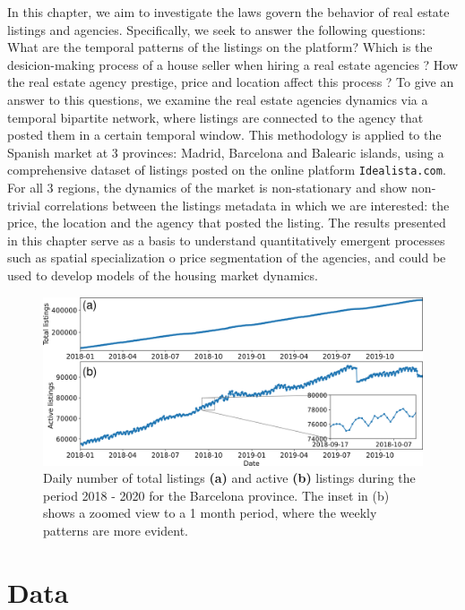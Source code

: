 In this chapter, we aim to investigate the laws govern the behavior of real estate listings and agencies. Specifically, we seek to answer the following questions: What are the temporal patterns of the listings on the platform? Which is the desicion-making process of a house seller when hiring a real estate agencies ? How the real estate agency prestige, price and location affect this process ? To give an answer to this questions, we examine the real estate agencies dynamics via a temporal bipartite network, where listings are connected to the agency that posted them in a certain temporal window. This methodology is applied to the Spanish market at 3 provinces: Madrid, Barcelona and Balearic islands, using a comprehensive dataset of listings posted on the online platform \texttt{Idealista.com}. For all 3 regions, the dynamics of the market is non-stationary and show non-trivial correlations between the listings metadata in which we are interested: the price, the location and the agency that posted the listing. The results presented in this chapter serve as a basis to understand quantitatively emergent processes such as spatial specialization o price segmentation of the agencies, and could be used to develop models of the housing market dynamics.

\begin{figure}
    \vspace{0.2 cm}
    \centering
    \includegraphics[width =\textwidth]{Figs/Idealista_dynamics/adds_evo.pdf}
	\caption[Active listings evolution.]{\label{fig:active_adds} Daily number of total listings \textbf{(a)} and active \textbf{(b)} listings during the period 2018 - 2020 for the Barcelona province. The inset in (b) shows a zoomed view to a 1 month period, where the weekly patterns are more evident.}
\end{figure}


\section{Data \label{sec:Data}}

